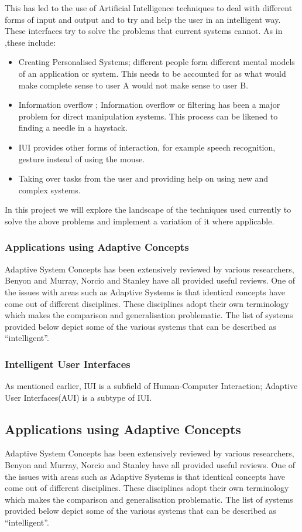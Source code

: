 This has led to the use of Artificial Intelligence techniques to deal with different forms of input and output and to try and help the user in an intelligent way. These interfaces try to solve the problems that current systems cannot. As in \cite{patrick2003intelligent},these include:
\begin{itemize}
\item Creating Personalised Systems; different people form different mental models of an application or system. This needs to be accounted for as what would make complete sense to user A would not make sense to user B.
\item Information overflow ; Information overflow or filtering has been a major problem for direct manipulation systems. This process can be likened to finding a needle in a haystack.
\item IUI provides other forms of interaction, for example speech recognition, gesture instead of using the mouse.
\item Taking over tasks from the user and providing help on using new and complex systems.
\end{itemize}
In this project we will explore the landscape of the techniques used currently to solve the above problems and implement a variation of it where applicable.

\subsubsection{Applications using Adaptive Concepts}
Adaptive System Concepts has been extensively reviewed by various researchers, Benyon and Murray\cite{benyon1993applying}, Norcio and Stanley\cite{norcio1989adaptive} have all provided useful reviews. One of the issues with areas such as Adaptive Systems is that identical concepts have come out of different disciplines. These disciplines adopt their own terminology which makes the comparison and generalisation problematic. The list of systems provided below depict some of the various systems that can be described as ``intelligent''.
\subsubsection{Intelligent User Interfaces}
As mentioned earlier, IUI is a subfield of Human-Computer Interaction; Adaptive User Interfaces(AUI) is a subtype of IUI. 
\subsection{Applications using Adaptive Concepts}
Adaptive System Concepts has been extensively reviewed by various researchers, Benyon and Murray\cite{benyon1993applying}, Norcio and Stanley\cite{norcio1989adaptive} have all provided useful reviews. One of the issues with areas such as Adaptive Systems is that identical concepts have come out of different disciplines. These disciplines adopt their own terminology which makes the comparison and generalisation problematic. The list of systems provided below depict some of the various systems that can be described as ``intelligent''.
